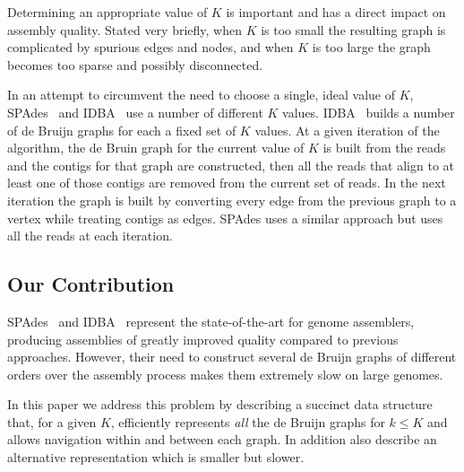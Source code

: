 Determining an appropriate value of $K$ is important and has a direct impact on
assembly quality. Stated very briefly, when $K$ is too small the resulting graph
is complicated by spurious edges and nodes, and when $K$ is too large the graph
becomes too sparse and possibly disconnected.

In an attempt to circumvent the need to choose a single, ideal value of $K$,
SPAdes~\cite{bankevich2012spades} and IDBA~\cite{peng2010idba} use a number of
different $K$ values.
IDBA~\cite{peng2010idba} builds a number of de Bruijn graphs for each a fixed
set of $K$ values.  At a given iteration of the algorithm, the de Bruin graph
for the current value of $K$ is built from the reads and the contigs for that
  graph are constructed, then all the reads that align to at least one of those
  contigs are removed from the current set of reads. In the next iteration the
  graph is built by converting every edge from the previous graph to a vertex
  while treating contigs as edges. SPAdes \cite{bankevich2012spades} uses a
    similar approach but uses all the reads at each iteration.  

\subsection{Our Contribution} SPAdes~\cite{bankevich2012spades} and
IDBA~\cite{peng2010idba} represent the state-of-the-art for genome assemblers,
producing assemblies of greatly improved quality compared to previous
approaches. However, their need to construct several de Bruijn graphs of
different orders over the assembly process makes them extremely slow on large
genomes.

In this paper we address this problem by describing a succinct data
structure that, for a given $K$, efficiently represents {\em all} the de Bruijn
graphs for $k \le K$ and allows navigation within and between each graph. In addition
also describe an alternative representation which is smaller but slower.

